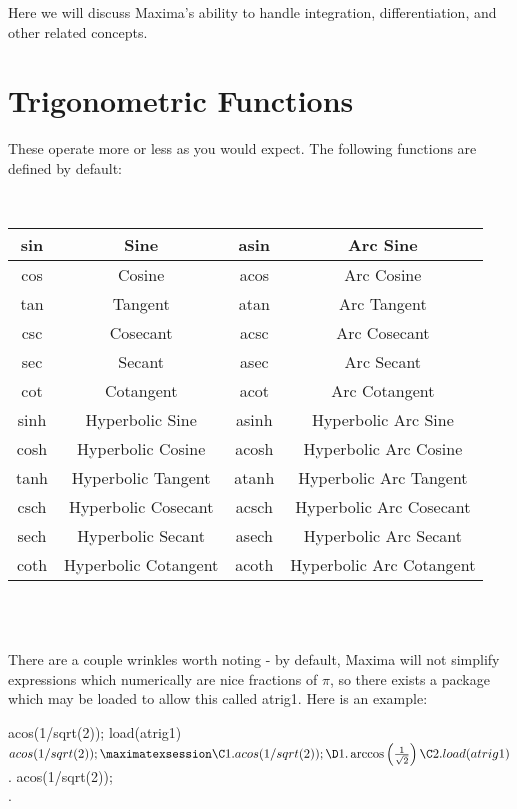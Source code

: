 
Here we will discuss Maxima's ability to handle integration, 
differentiation, and other related concepts.

\section{Trigonometric Functions}

These operate more or less as you would expect.  The following functions
are defined by default:

~

{\center \begin{tabular}{|c|c|c|c|}
\hline 
sin&
Sine&
asin&
Arc Sine\\
\hline
cos&
Cosine&
acos&
Arc Cosine\\
\hline 
tan&
Tangent&
atan&
Arc Tangent\\
\hline 
csc&
Cosecant&
acsc&
Arc Cosecant\\
\hline 
sec&
Secant&
asec&
Arc Secant\\
\hline 
cot&
Cotangent&
acot&
Arc Cotangent\\
\hline 
sinh&
Hyperbolic Sine&
asinh&
Hyperbolic Arc Sine\\
\hline 
cosh&
Hyperbolic Cosine&
acosh&
Hyperbolic Arc Cosine\\
\hline 
tanh&
Hyperbolic Tangent&
atanh&
Hyperbolic Arc Tangent\\
\hline 
csch&
Hyperbolic Cosecant&
acsch&
Hyperbolic Arc Cosecant\\
\hline 
sech&
Hyperbolic Secant&
asech&
Hyperbolic Arc Secant\\
\hline 
coth&
Hyperbolic Cotangent&
acoth&
Hyperbolic Arc Cotangent\\
\hline
\end{tabular} \par}

~\\

~

There are a couple wrinkles worth noting - by default, Maxima will not
simplify expressions which numerically are nice fractions of $\pi$, so
there exists a package which may be loaded to allow this called
atrig1.  Here is an example:

\beginmaximasession
acos(1/sqrt(2));
load(atrig1)$
acos(1/sqrt(2));
\maximatexsession
\C1.  acos(1/sqrt(2)); \\
\D1.  \arccos \left(\frac{1}{\sqrt{2}}\right) \\
\C2.  load(atrig1)$ \\
.  acos(1/sqrt(2)); \\
.   \\
\endmaximasession

